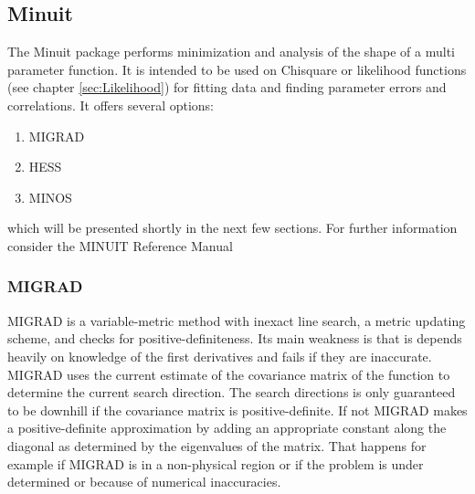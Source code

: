 \documentclass[english]{uzhpub}
\begin{document}
%

\subsection{Minuit} \label{sec:Minuit}
The Minuit package performs minimization and analysis of the shape of a multi parameter function. It is intended to be used on Chisquare or likelihood functions (see chapter \ref{sec:Likelihood}) for fitting data and finding parameter errors and correlations. It offers several options:
\begin{enumerate}
 \item MIGRAD
 \item HESS
 \item MINOS
\end{enumerate}
which will be presented shortly in the next few sections.
For further information consider the MINUIT Reference Manual \cite{bib:MinuitRM}

\subsubsection*{MIGRAD}
MIGRAD is a variable-metric method with inexact line search, a metric updating scheme, and checks for positive-definiteness. Its main weakness is that is depends heavily on knowledge of the first derivatives and fails if they are inaccurate. MIGRAD uses the current estimate of the covariance matrix of the function to determine the current search direction. The search directions is only guaranteed to be downhill if the covariance matrix is positive-definite. If not MIGRAD makes a positive-definite approximation by adding an appropriate constant along the diagonal as determined by the eigenvalues of the matrix. That happens for example if MIGRAD is in a non-physical region or if the problem is under determined or because of numerical inaccuracies.
\end{document}
